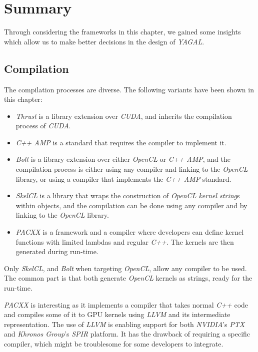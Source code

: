 \section{Summary}
Through considering the frameworks in this chapter, we gained some insights which allow us to make better decisions in the design of \textit{YAGAL}.

\subsection{Compilation}
The compilation processes are diverse. The following variants have been shown in this chapter:

\begin{itemize}
\item \textit{Thrust} is a library extension over \textit{CUDA}, and inherits the compilation process of \textit{CUDA}.
\item \textit{C++ AMP} is a standard that requires the compiler to implement it.
\item \textit{Bolt} is a library extension over either \textit{OpenCL} or \textit{C++ AMP}, and the compilation process is either using any compiler and linking to the \textit{OpenCL} library, or using a compiler that implements the \textit{C++ AMP} standard.
\item \textit{SkelCL} is a library that wraps the construction of \textit{OpenCL kernel string}s within objects, and the compilation can be done using any compiler and by linking to the \textit{OpenCL} library.
\item \textit{PACXX} is a framework and a compiler where developers can define kernel functions with limited lambdas and regular \textit{C++}. The kernels are then generated during run-time.
\end{itemize}

Only \textit{SkelCL}, and \textit{Bolt} when targeting \textit{OpenCL}, allow any compiler to be used. The common part is that both generate \textit{OpenCL} kernels as strings, ready for the run-time.

\textit{PACXX} is interesting as it implements a compiler that takes normal \textit{C++} code and compiles some of it to GPU kernels using \textit{LLVM} and its intermediate representation. The use of \textit{LLVM} is enabling support for both \textit{NVIDIA}'s \textit{PTX} and \textit{Khronos Group}'s \textit{SPIR} platform. It has the drawback of requiring a specific compiler, which might be troublesome for some developers to integrate.

